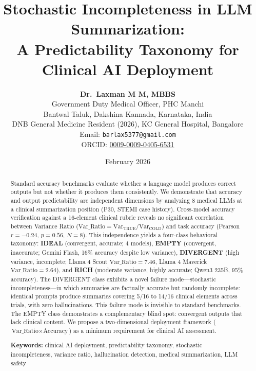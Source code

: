 \documentclass[11pt,a4paper]{article}
\title{\LARGE\textbf{Stochastic Incompleteness in LLM Summarization:\\A Predictability Taxonomy for Clinical AI Deployment}}
\author{
    \textbf{Dr.\ Laxman M M, MBBS}\\
    Government Duty Medical Officer, PHC Manchi\\
    Bantwal Taluk, Dakshina Kannada, Karnataka, India\\
    DNB General Medicine Resident (2026), KC General Hospital, Bangalore\\
    Email: \texttt{barlax5377@gmail.com}\\
    ORCID: \href{https://orcid.org/0009-0009-0405-6531}{0009-0009-0405-6531}
}
\date{February 2026}
\begin{document}
\maketitle

\begin{center}
\end{center}

\vspace{0.5em}

\begin{abstract}
\noindent Standard accuracy benchmarks evaluate whether a language model produces correct outputs but not whether it produces them consistently. We demonstrate that accuracy and output predictability are independent dimensions by analyzing 8 medical LLMs at a clinical summarization position (P30, STEMI case history). Cross-model accuracy verification against a 16-element clinical rubric reveals no significant correlation between Variance Ratio ($\text{Var\_Ratio} = \text{Var}_{\text{TRUE}} / \text{Var}_{\text{COLD}}$) and task accuracy (Pearson $r = -0.24$, $p = 0.56$, $N = 8$). This independence yields a four-class behavioral taxonomy: \textbf{IDEAL} (convergent, accurate; 4 models), \textbf{EMPTY} (convergent, inaccurate; Gemini Flash, 16\% accuracy despite low variance), \textbf{DIVERGENT} (high variance, incomplete; Llama 4 Scout $\text{Var\_Ratio} = 7.46$, Llama 4 Maverick $\text{Var\_Ratio} = 2.64$), and \textbf{RICH} (moderate variance, highly accurate; Qwen3 235B, 95\% accuracy). The DIVERGENT class exhibits a novel failure mode---stochastic incompleteness---in which summaries are factually accurate but randomly incomplete: identical prompts produce summaries covering 5/16 to 14/16 clinical elements across trials, with zero hallucinations. This failure mode is invisible to standard benchmarks. The EMPTY class demonstrates a complementary blind spot: convergent outputs that lack clinical content. We propose a two-dimensional deployment framework ($\text{Var\_Ratio} \times \text{Accuracy}$) as a minimum requirement for clinical AI assessment.

\vspace{0.5em}
\noindent\textbf{Keywords:} clinical AI deployment, predictability taxonomy, stochastic incompleteness, variance ratio, hallucination detection, medical summarization, LLM safety
\end{abstract}
\end{document}
